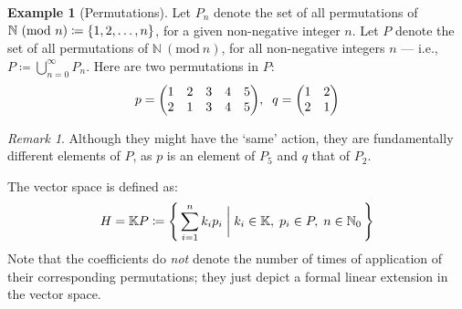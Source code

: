\documentclass{article}
\theoremstyle{definition}
\newtheorem{Example}{Example}
\theoremstyle{remark}
\newtheorem*{Remark*}{Remark}
\theoremstyle{underline}
\theoremstyle{underline}
\newcommand{\Mod}[1]{\ (\mathrm{mod}\ #1)}
\begin{document}
	\begin{Example}[Permutations]
		Let $P_n$ denote the set of all permutations of $\mathbb N\Mod n \coloneqq \qty{1, 2, \ldots, n}$, for a given non-negative integer $n$. Let $P$ denote the set of all permutations of $\mathbb N \Mod n$, for all non-negative integers $n$ --- i.e., $P \coloneqq \bigcup\limits_{n = 0}^\infty P_n$. Here are two permutations in $P$:
		\begin{gather*}
		p = \mqty(1 & 2 & 3 & 4 & 5 \\ 2 & 1 & 3 & 4 & 5), \;\; q = \mqty(1 & 2 \\ 2 & 1) 
		\end{gather*}
		
		\begin{Remark*}
			Although they might have the `same' action, they are fundamentally different elements of $P$, as $p$ is an element of $P_5$ and $q$ that of $P_2$.
		\end{Remark*}
		
		The vector space is defined as:
		\begin{gather*}
		H = \mathbb KP \coloneqq \qty{\, \sum_{i = 1}^n k_i p_i \;\bigg|\; k_i \in \mathbb K,\; p_i \in P,\; n \in \mathbb N_0\,}
		\end{gather*}
		Note that the coefficients do \emph{not} denote the number of times of application of their corresponding permutations; they just depict a formal linear extension in the vector space.
		

\end{Example}
\end{document}
